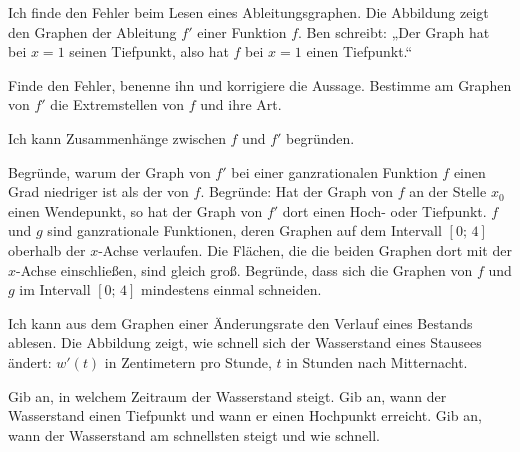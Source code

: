 \begin{aufgabe}{Ich finde den Fehler beim Lesen eines Ableitungsgraphen. Die Abbildung zeigt den Graphen der Ableitung $f'$ einer Funktion $f$. Ben schreibt: „Der Graph hat bei $x = 1$ seinen Tiefpunkt, also hat $f$ bei $x = 1$ einen Tiefpunkt.“}

\begin{ksys}[xmin=-2,xmax=4,ymin=-5,ymax=5,ablesen]
\end{ksys}

\begin{teile}
\teil Finde den Fehler, benenne ihn und korrigiere die Aussage.
\teil Bestimme am Graphen von $f'$ die Extremstellen von $f$ und ihre Art.
\end{teile}
\end{aufgabe}

\begin{aufgabe}{Ich kann Zusammenhänge zwischen $f$ und $f'$ begründen.}
\begin{teile}
\teil Begründe, warum der Graph von $f'$ bei einer ganzrationalen Funktion $f$ einen Grad niedriger ist als der von $f$.
\teil Begründe: Hat der Graph von $f$ an der Stelle $x_0$ einen Wendepunkt, so hat der Graph von $f'$ dort einen Hoch- oder Tiefpunkt.
\teil $f$ und $g$ sind ganzrationale Funktionen, deren Graphen auf dem Intervall $[0;\,4]$ oberhalb der $x$-Achse verlaufen. Die Flächen, die die beiden Graphen dort mit der $x$-Achse einschließen, sind gleich groß. Begründe, dass sich die Graphen von $f$ und $g$ im Intervall $[0;\,4]$ mindestens einmal schneiden.
\end{teile}
\end{aufgabe}

\begin{aufgabe}{Ich kann aus dem Graphen einer Änderungsrate den Verlauf eines Bestands ablesen. Die Abbildung zeigt, wie schnell sich der Wasserstand eines Stausees ändert: $w'(t)$ in Zentimetern pro Stunde, $t$ in Stunden nach Mitternacht.}

\begin{ksys}[xmin=0,xmax=12,ymin=-6,ymax=5,ablesen,xlabel=$t$ in h,ylabel=$w'(t)$ in cm/h]
\end{ksys}

\begin{teile}
\teil Gib an, in welchem Zeitraum der Wasserstand steigt. \leerfeld
\teil Gib an, wann der Wasserstand einen Tiefpunkt und wann er einen Hochpunkt erreicht.
\teil Gib an, wann der Wasserstand am schnellsten steigt und wie schnell.
\end{teile}
\end{aufgabe}

